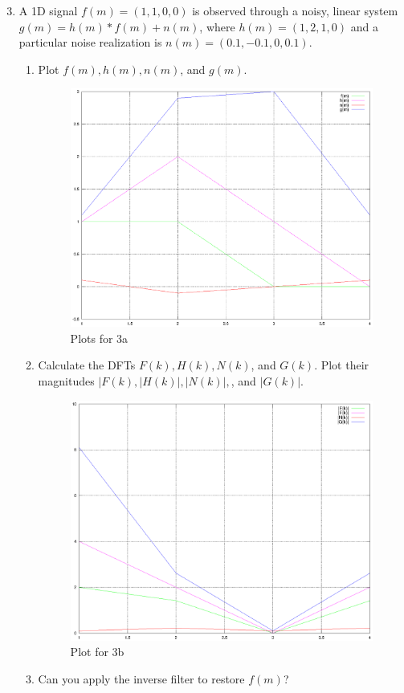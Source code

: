 \documentclass[10pt, a4paper]{article}
\begin{document}

\begin{enumerate}
    \setcounter{enumi}{2}
  \item A 1D signal $f(m) = (1,1,0,0)$ is observed through a noisy, linear system 
    $g(m) = h(m) * f(m) + n(m)$, where $h(m)=(1,2,1,0)$ and a particular 
    noise realization is $n(m)=(0.1,-0.1,0,0.1)$.
    \begin{enumerate}
      \item Plot $f(m), h(m), n(m)$, and $g(m)$.
        \begin{figure}[h!]
          \centering
          \includegraphics[scale=0.55]{../data/3a.eps}
          \caption{Plots for 3a}
        \end{figure}
      \item Calculate the DFTs $F(k), H(k), N(k)$, and $G(k)$. Plot their
        magnitudes $|F(k), |H(k)|, |N(k)|,$, and $|G(k)|$.
        \begin{figure}[h!]
          \centering
          \includegraphics[scale=0.55]{../data/3b.eps}
          \caption{Plot for 3b}
        \end{figure}
      \item Can you apply the inverse filter to restore $f(m)$?


\end{enumerate}
\end{enumerate}
\end{document}
